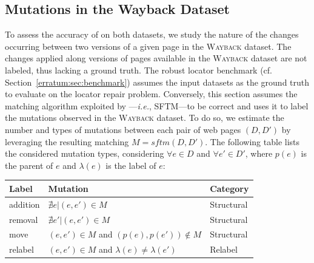 \subsection{Mutations in the {\sc Wayback} Dataset}
To assess the accuracy of \erratum on both datasets, we study the nature of the changes occurring between two versions of a given page in the \textsc{Wayback} dataset.
The changes applied along versions of pages available in the \textsc{Wayback} dataset are not labeled, thus lacking a ground truth.
% 
The robust locator benchmark (cf. Section~\ref{erratum:sec:benchmark}) assumes the input datasets as the ground truth to evaluate \erratum on the locator repair problem.
Conversely, this section assumes the matching algorithm exploited by \erratum---\emph{i.e.}, SFTM---to be correct and uses it to label the mutations observed in the \textsc{Wayback} dataset.
% 
To do so, we estimate the number and types of mutations between each pair of web pages $(D, D')$ by leveraging the resulting matching $M = sftm(D,D')$.
The following table lists the considered mutation types, considering $\forall e \in D$ and $\forall e' \in D'$, where $p(e)$ is the parent of $e$ and $\lambda(e)$ is the label of $e$:
\begin{table}[h]
\centering
\begin{tabular}{|l|l|l|}
\hline
Label        & Mutation                                          & Category \\ \hline
\hline
\sf addition & $\nexists e | (e, e') \in M$                      & Structural \\ \hline
\sf removal  & $\nexists e' | (e, e') \in M$                     & Structural \\ \hline
\sf move     & $(e, e') \in M$ and $(p(e), p(e')) \notin M$      & Structural \\ \hline
\sf relabel  & $(e, e') \in M$ and $\lambda(e) \neq \lambda(e')$ & Relabel \\ \hline
\end{tabular}
\end{table}


